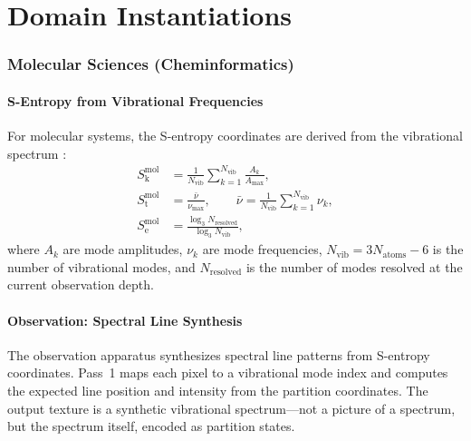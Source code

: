 \documentclass[11pt,twocolumn,a4paper]{article}
\theoremstyle{definition}
\theoremstyle{remark}
\newcommand{\Sk}{S_{\mathrm{k}}}
\newcommand{\St}{S_{\mathrm{t}}}
\newcommand{\Se}{S_{\mathrm{e}}}
\begin{document}

\part{Domain Instantiations}

\section{Molecular Sciences (Cheminformatics)}
\label{sec:molecular}

\subsection{S-Entropy from Vibrational Frequencies}

For molecular systems, the S-entropy coordinates are derived from the vibrational spectrum \citep{sachikonye2025b}:
\begin{align}
\Sk^{\mathrm{mol}} &= \frac{1}{N_{\mathrm{vib}}} \sum_{k=1}^{N_{\mathrm{vib}}} \frac{A_k}{A_{\max}}, \label{eq:sk_mol} \\
\St^{\mathrm{mol}} &= \frac{\bar{\nu}}{\nu_{\max}}, \qquad \bar{\nu} = \frac{1}{N_{\mathrm{vib}}} \sum_{k=1}^{N_{\mathrm{vib}}} \nu_k, \label{eq:st_mol} \\
\Se^{\mathrm{mol}} &= \frac{\log_3 N_{\mathrm{resolved}}}{\log_3 N_{\mathrm{vib}}}, \label{eq:se_mol}
\end{align}
where $A_k$ are mode amplitudes, $\nu_k$ are mode frequencies, $N_{\mathrm{vib}} = 3N_{\mathrm{atoms}} - 6$ is the number of vibrational modes, and $N_{\mathrm{resolved}}$ is the number of modes resolved at the current observation depth.

\subsection{Observation: Spectral Line Synthesis}

The observation apparatus synthesizes spectral line patterns from S-entropy coordinates. Pass~1 maps each pixel to a vibrational mode index and computes the expected line position and intensity from the partition coordinates. The output texture is a synthetic vibrational spectrum---not a picture of a spectrum, but the spectrum itself, encoded as partition states.
\end{document}
